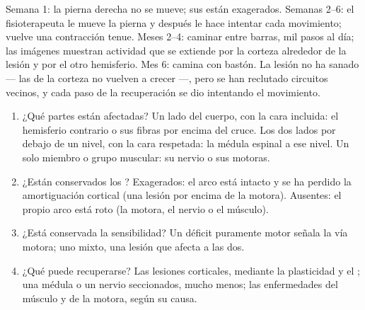 \begin{example}\label{ex:g12:brain-and-movement:sixmonths}
Semana 1: la pierna derecha no se mueve; sus  están exagerados.
Semanas 2--6: el fisioterapeuta le mueve la pierna y después le hace
intentar cada movimiento; vuelve una contracción tenue. Meses 2--4:
caminar entre barras, mil pasos al día; las imágenes muestran actividad
que se extiende por la corteza alrededor de la lesión y por el otro
hemisferio. Mes 6: camina con bastón. La lesión no ha sanado --- las
 de la corteza no vuelven a crecer ---, pero se han reclutado
circuitos vecinos, y cada paso de la recuperación se dio intentando el
movimiento.
\end{example}

\begin{method}\label{met:g12:brain-and-movement:locate}
\begin{enumerate}
  \item ¿Qué partes están afectadas? Un lado del cuerpo, con la cara
        incluida: el hemisferio contrario o sus fibras por encima del
        cruce. Los dos lados por debajo de un nivel, con la cara
        respetada: la médula espinal a ese nivel. Un solo miembro o
        grupo muscular: su nervio o sus  motoras.
  \item ¿Están conservados los ? Exagerados: el arco está
        intacto y se ha perdido la amortiguación cortical (una lesión
        por encima de la  motora). Ausentes: el propio arco está
        roto (la  motora, el nervio o el músculo).
  \item ¿Está conservada la sensibilidad? Un déficit puramente motor
        señala la vía motora; uno mixto, una lesión que afecta a las
        dos.
  \item ¿Qué puede recuperarse? Las lesiones corticales, mediante la
        plasticidad y el ; una médula o un nervio
        seccionados, mucho menos; las enfermedades del músculo y de la
         motora, según su causa.
\end{enumerate}
\end{method}

